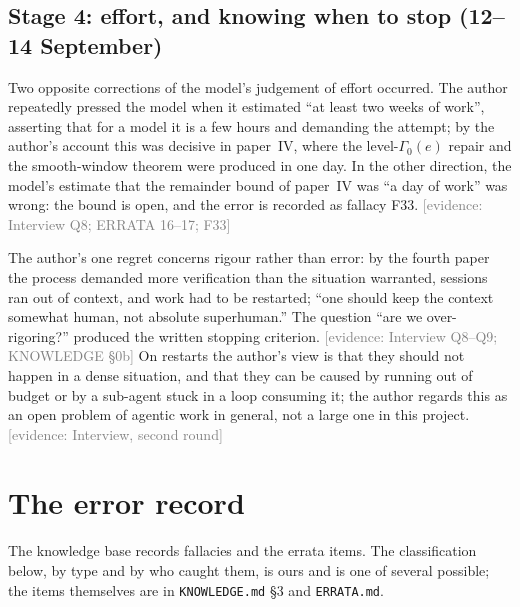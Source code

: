 \documentclass[11pt,a4paper]{article}
\newcommand{\evidence}[1]{{\footnotesize\textcolor{Gray}{[evidence: #1]}}}
\newcommand{\file}[1]{\texttt{#1}}
\begin{document}
\subsection{Stage 4: effort, and knowing when to stop (12--14 September)}
Two opposite corrections of the model's judgement of effort occurred. The author repeatedly pressed the model when
it estimated ``at least two weeks of work'', asserting that for a model it is a few hours and demanding the attempt;
by the author's account this was decisive in paper~IV, where the level-$\Gamma_0(e)$ repair and the smooth-window
theorem were produced in one day. In the other direction, the model's estimate that the remainder bound of paper~IV
was ``a day of work'' was wrong: the bound is open, and the error is recorded as fallacy F33. \evidence{Interview
Q8; ERRATA 16--17; F33}

The author's one regret concerns rigour rather than error: by the fourth paper the process demanded more
verification than the situation warranted, sessions ran out of context, and work had to be restarted; ``one should
keep the context somewhat human, not absolute superhuman.'' The question ``are we over-rigoring?'' produced the
written stopping criterion. \evidence{Interview Q8--Q9; KNOWLEDGE \S0b}
On restarts the author's view is that they should not happen in a dense situation, and that they can be caused by
running out of budget or by a sub-agent stuck in a loop consuming it; the author regards this as an open problem of
agentic work in general, not a large one in this project. \evidence{Interview, second round}

\section{The error record}\label{sec:errors}

The knowledge base records \NFallacies{} fallacies and the errata \NErrata{} items. The classification below, by
type and by who caught them, is ours and is one of several possible; the items themselves are in
\file{KNOWLEDGE.md} \S3 and \file{ERRATA.md}.
\end{document}
